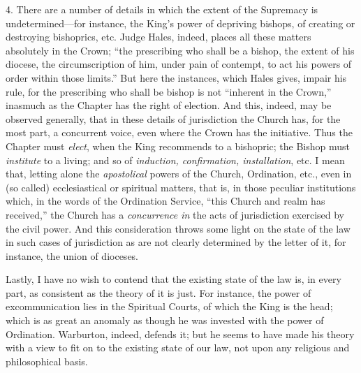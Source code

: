 4. There are a number of
details in which the extent of the Supremacy is undetermined—for
instance, the King's power of depriving bishops, of creating or
destroying bishoprics, etc. Judge Hales, indeed, places all
these matters absolutely in the Crown; ``the prescribing who shall be a
bishop, the extent of his diocese, the circumscription of him, under
pain of contempt, to act his powers of order within those limits.'' But
here the instances, which Hales gives, impair his rule, for the
prescribing who shall be bishop is not ``inherent in the Crown,'' inasmuch as
the Chapter has the right of election. And this, indeed, may be
observed generally, that in these details of jurisdiction the Church
has, for the most part, a concurrent voice, even where the Crown has
the initiative. Thus the Chapter must \emph{elect}, when the King
recommends to a bishopric; the Bishop must \emph{institute} to a
living; and so of \emph{induction, confirmation, installation}, etc. I
mean that, letting alone the \emph{apostolical} powers of the Church,
Ordination, etc., even in (so called) ecclesiastical or spiritual
matters, that is, in those peculiar institutions which, in the words
of the Ordination Service, ``this Church and realm has received,'' the
Church has a \emph{concurrence in} the acts of jurisdiction exercised by the
civil power. And this consideration throws some light on the state of
the law in such cases of jurisdiction as are not clearly determined by
the letter of it, for instance, the union of dioceses.

Lastly, I have no wish to
contend that the existing state of the law is, in every part, as
consistent as the theory of it is just. For instance, the power of
excommunication lies in the Spiritual Courts, of which the King is the
head; which is as great an anomaly as though he was invested with the
power of Ordination. Warburton, indeed, defends it; but he seems to
have made his theory with a view to fit on to the existing state of
our law, not upon any religious and philosophical basis.
